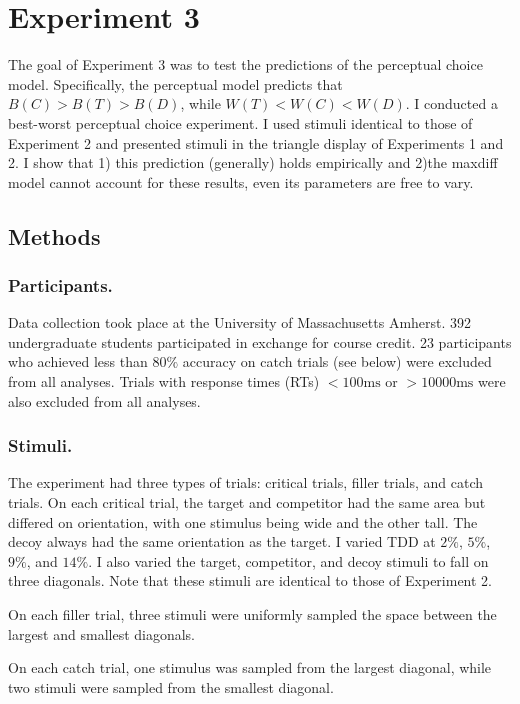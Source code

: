 \section{Experiment 3}

The goal of Experiment 3 was to test the predictions of the perceptual choice model. Specifically, the perceptual model predicts that $B(C)>B(T)>B(D)$, while $W(T)<W(C)<W(D)$. I conducted a best-worst perceptual choice experiment. I used stimuli identical to those of Experiment 2 and presented stimuli in the triangle display of Experiments 1 and 2.
I show that 1) this prediction (generally) holds empirically and 2)the maxdiff model cannot account for these results, even its parameters are free to vary. 

\subsection{Methods}

\subsubsection{Participants.}
Data collection took place at the University of Massachusetts Amherst. 392 undergraduate students participated in exchange for course credit. 23 participants who achieved less than $80\%$ accuracy on catch trials (see below) were excluded from all analyses. Trials with response times (RTs) $<100\text{ms}$ or  $>10000\text{ms}$ were also excluded from all analyses.

\subsubsection{Stimuli.}
The experiment had three types of trials: critical trials, filler trials, and catch trials. 
On each critical trial, the target and competitor had the same area but differed on orientation, with one stimulus being wide and the other tall. The decoy always had the same orientation as the target. I varied TDD at $2\%$, $5\%$, $9\%$, and $14\%$. I also varied the target, competitor, and decoy stimuli to fall on three diagonals. Note that these stimuli are identical to those of Experiment 2.

On each filler trial, three stimuli were uniformly sampled the space between the largest and smallest diagonals.

On each catch trial, one stimulus was sampled from the largest diagonal, while two stimuli were sampled from the smallest diagonal.

